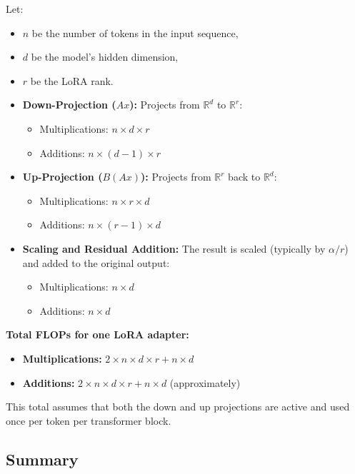 \documentclass[a4paper,12pt]{article}
\begin{document}
Let:
\begin{itemize}
  \item $n$ be the number of tokens in the input sequence,
  \item $d$ be the model's hidden dimension,
  \item $r$ be the LoRA rank.
\end{itemize}

\begin{itemize}
  \item \textbf{Down-Projection ($A x$):} Projects from $\mathbb{R}^{d}$ to $\mathbb{R}^{r}$:
  \begin{itemize}
    \item Multiplications: $n \times d \times r$
    \item Additions: $n \times (d - 1) \times r$
  \end{itemize}

  \item \textbf{Up-Projection ($B (A x)$):} Projects from $\mathbb{R}^{r}$ back to $\mathbb{R}^{d}$:
  \begin{itemize}
    \item Multiplications: $n \times r \times d$
    \item Additions: $n \times (r - 1) \times d$
  \end{itemize}

  \item \textbf{Scaling and Residual Addition:} The result is scaled (typically by $\alpha / r$) and added to the original output:
  \begin{itemize}
    \item Multiplications: $n \times d$
    \item Additions: $n \times d$
  \end{itemize}
\end{itemize}

\textbf{Total FLOPs for one LoRA adapter:}
\begin{itemize}
  \item \textbf{Multiplications:} $2 \times n \times d \times r + n \times d$
  \item \textbf{Additions:} $2 \times n \times d \times r + n \times d$ (approximately)
\end{itemize}
This total assumes that both the down and up projections are active and used once per token per transformer block.


\subsection*{Summary}
\end{document}
